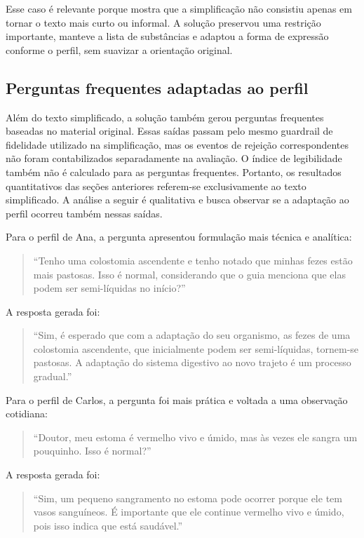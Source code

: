 Esse caso é relevante porque mostra que a simplificação não consistiu apenas em tornar o texto mais curto ou informal. A solução preservou uma restrição importante, manteve a lista de substâncias e adaptou a forma de expressão conforme o perfil, sem suavizar a orientação original.

\subsection{Perguntas frequentes adaptadas ao perfil}
\label{subsec:perguntas-frequentes-adaptadas-perfil}

Além do texto simplificado, a solução também gerou perguntas frequentes baseadas no material original. Essas saídas passam pelo mesmo guardrail de fidelidade utilizado na simplificação, mas os eventos de rejeição correspondentes não foram contabilizados separadamente na avaliação. O índice de legibilidade também não é calculado para as perguntas frequentes. Portanto, os resultados quantitativos das seções anteriores referem-se exclusivamente ao texto simplificado. A análise a seguir é qualitativa e busca observar se a adaptação ao perfil ocorreu também nessas saídas.

Para o perfil de Ana, a pergunta apresentou formulação mais técnica e analítica:

\begin{quote}
``Tenho uma colostomia ascendente e tenho notado que minhas fezes estão mais pastosas. Isso é normal, considerando que o guia menciona que elas podem ser semi-líquidas no início?''
\end{quote}

A resposta gerada foi:

\begin{quote}
``Sim, é esperado que com a adaptação do seu organismo, as fezes de uma colostomia ascendente, que inicialmente podem ser semi-líquidas, tornem-se pastosas. A adaptação do sistema digestivo ao novo trajeto é um processo gradual.''
\end{quote}

Para o perfil de Carlos, a pergunta foi mais prática e voltada a uma observação cotidiana:

\begin{quote}
``Doutor, meu estoma é vermelho vivo e úmido, mas às vezes ele sangra um pouquinho. Isso é normal?''
\end{quote}

A resposta gerada foi:

\begin{quote}
``Sim, um pequeno sangramento no estoma pode ocorrer porque ele tem vasos sanguíneos. É importante que ele continue vermelho vivo e úmido, pois isso indica que está saudável.''
\end{quote}

